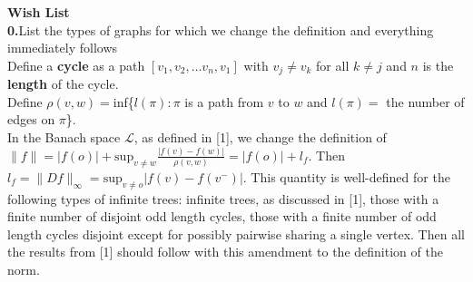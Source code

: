 \documentclass[11 pt]{report}
\begin{document}



\tableofcontents







\startofchapters



\textbf{Wish List}\\

\textbf{0.}List the types of graphs for which we change the definition and everything immediately follows\\

\indent \indent Define a \textbf{cycle} as a path $[v_1, v_2, \dots v_n, v_1]$ with $v_j \neq v_k$ for all $k \neq j$ and $n$ is the \textbf{length} of the cycle.\\

\indent \indent Define $\rho (v,w) = $inf\{$l(\pi): \pi$ is a path from $v$ to $w$ and $l(\pi)=$ the number of edges on $\pi$\}. \\

\indent \indent In the Banach space $\mathcal{L}$, as defined in [1], we change the definition of $\| f \| = |f(o)| + \text{sup}_{v \neq w} \frac{|f(v)-f(w)|}{\rho(v,w)} = |f(o)| + \textit{l}_f$. Then $\textit{l}_f = \|Df\|_\infty = \text{sup}_{v \neq o} |f(v)-f(v^-)|$. This quantity is well-defined for the following types of infinite trees: infinite trees, as discussed in [1], those with a finite number of disjoint odd length cycles, those with a finite number of odd length cycles disjoint except for possibly pairwise sharing a single vertex. Then all the results from [1] should follow with this amendment to the definition of the norm. \\
\end{document}
